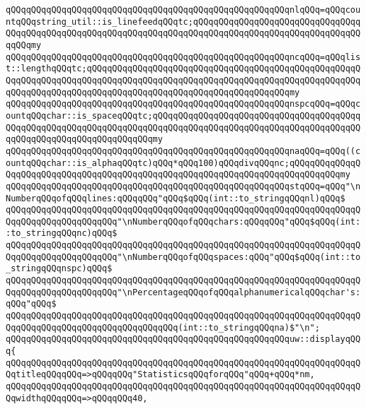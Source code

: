 \verb|qQQqqQQqqQQqqQQqqQQqqQQqqQQqqQQqqQQqqQQqqQQqqQQqqQQqqQQqnlqQQq=qQQqcountqQQqstring_util::is_linefeedqQQqtc;qQQqqQQqqQQqqQQqqQQqqQQqqQQqqQQqqQQqqQQqqQQqqQQqqQQqqQQqqQQqqQQqqQQqqQQqqQQqqQQqqQQqqQQqqQQqqQQqqQQqqQQqqQQqmy|\newline
\verb|qQQqqQQqqQQqqQQqqQQqqQQqqQQqqQQqqQQqqQQqqQQqqQQqqQQqqQQqncqQQq=qQQqlist::lengthqQQqtc;qQQqqQQqqQQqqQQqqQQqqQQqqQQqqQQqqQQqqQQqqQQqqQQqqQQqqQQqqQQqqQQqqQQqqQQqqQQqqQQqqQQqqQQqqQQqqQQqqQQqqQQqqQQqqQQqqQQqqQQqqQQqqQQqqQQqqQQqqQQqqQQqqQQqqQQqqQQqqQQqqQQqqQQqqQQqqQQqqQQqmy|\newline
\verb|qQQqqQQqqQQqqQQqqQQqqQQqqQQqqQQqqQQqqQQqqQQqqQQqqQQqqQQqnspcqQQq=qQQqcountqQQqchar::is_spaceqQQqtc;qQQqqQQqqQQqqQQqqQQqqQQqqQQqqQQqqQQqqQQqqQQqqQQqqQQqqQQqqQQqqQQqqQQqqQQqqQQqqQQqqQQqqQQqqQQqqQQqqQQqqQQqqQQqqQQqqQQqqQQqqQQqqQQqqQQqqQQqqQQqmy|\newline
\verb|qQQqqQQqqQQqqQQqqQQqqQQqqQQqqQQqqQQqqQQqqQQqqQQqqQQqqQQqnaqQQq=qQQq((countqQQqchar::is_alphaqQQqtc)qQQq*qQQq100)qQQqdivqQQqnc;qQQqqQQqqQQqqQQqqQQqqQQqqQQqqQQqqQQqqQQqqQQqqQQqqQQqqQQqqQQqqQQqqQQqqQQqqQQqqQQqmy|\newline
\verb|qQQqqQQqqQQqqQQqqQQqqQQqqQQqqQQqqQQqqQQqqQQqqQQqqQQqqQQqstqQQq=qQQq"\nNumberqQQqofqQQqlines:qQQqqQQq"qQQq$qQQq(int::to_stringqQQqnl)qQQq$|\newline
\verb|qQQqqQQqqQQqqQQqqQQqqQQqqQQqqQQqqQQqqQQqqQQqqQQqqQQqqQQqqQQqqQQqqQQqqQQqqQQqqQQqqQQqqQQqqQQq"\nNumberqQQqofqQQqchars:qQQqqQQq"qQQq$qQQq(int::to_stringqQQqnc)qQQq$|\newline
\verb|qQQqqQQqqQQqqQQqqQQqqQQqqQQqqQQqqQQqqQQqqQQqqQQqqQQqqQQqqQQqqQQqqQQqqQQqqQQqqQQqqQQqqQQqqQQq"\nNumberqQQqofqQQqspaces:qQQq"qQQq$qQQq(int::to_stringqQQqnspc)qQQq$|\newline
\verb|qQQqqQQqqQQqqQQqqQQqqQQqqQQqqQQqqQQqqQQqqQQqqQQqqQQqqQQqqQQqqQQqqQQqqQQqqQQqqQQqqQQqqQQqqQQq"\nPercentageqQQqofqQQqalphanumericalqQQqchar's:qQQq"qQQq$|\newline
\verb|qQQqqQQqqQQqqQQqqQQqqQQqqQQqqQQqqQQqqQQqqQQqqQQqqQQqqQQqqQQqqQQqqQQqqQQqqQQqqQQqqQQqqQQqqQQqqQQqqQQqqQQq(int::to_stringqQQqna)$"\n";|\newline
\newline
\verb|qQQqqQQqqQQqqQQqqQQqqQQqqQQqqQQqqQQqqQQqqQQqqQQqqQQqqQQquw::displayqQQq{|\newline
\verb|qQQqqQQqqQQqqQQqqQQqqQQqqQQqqQQqqQQqqQQqqQQqqQQqqQQqqQQqqQQqqQQqqQQqqQQqtitleqQQqqQQq=>qQQqqQQq"StatisticsqQQqforqQQq"qQQq+qQQq*nm,|\newline
\verb|qQQqqQQqqQQqqQQqqQQqqQQqqQQqqQQqqQQqqQQqqQQqqQQqqQQqqQQqqQQqqQQqqQQqqQQqwidthqQQqqQQq=>qQQqqQQq40,|\newline
